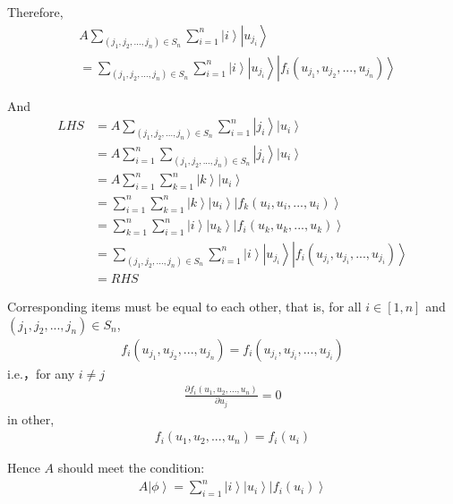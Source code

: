 \documentclass[%
 reprint,
 amsmath,amssymb,
pra,
]{revtex4-1}
\begin{document}
\begin{itemize}
Therefore,  
\begin{align*}
	&A\sum_{\left(j_1, j_2, ..., j_n\right)\in S_n}\sum_{i=1}^n \left|i\right\rangle\left|u_{j_i}\right\rangle \\
	&=\sum_{\left(j_1, j_2, ..., j_n\right)\in S_n}\sum_{i=1}^n\left|i\right\rangle\left|u_{j_i}\right\rangle\left|f_{i}\left(u_{j_1}, u_{j_2}, ..., u_{j_n}\right)\right\rangle
\end{align*}

And
\begin{align*}
	LHS &= A\sum_{\left(j_1, j_2, ..., j_n\right)\in S_n}\sum_{i=1}^n \left|j_i\right\rangle\left|u_i\right\rangle\\
	&= A\sum_{i=1}^n\sum_{\left(j_1, j_2, ..., j_n\right)\in S_n}\left|j_i\right\rangle\left|u_i\right\rangle\\
	&= A\sum_{i=1}^n\sum_{k=1}^n\left|k\right\rangle\left|u_i\right\rangle \\
	&= \sum_{i=1}^n\sum_{k=1}^n\left|k\right\rangle\left|u_i\right\rangle\left|f_{k}\left(u_i, u_i, ..., u_i\right)\right\rangle\\
	&= \sum_{k=1}^n\sum_{i=1}^n\left|i\right\rangle\left|u_k\right\rangle\left|f_{i}\left(u_k, u_k, ..., u_k\right)\right\rangle \\
	&= \sum_{\left(j_1, j_2, ..., j_n\right)\in S_n}\sum_{i=1}^n\left|i\right\rangle\left|u_{j_i}\right\rangle\left|f_{i}\left(u_{j_i}, u_{j_i}, ..., u_{j_i}\right)\right\rangle\\
	&= RHS
\end{align*}

Corresponding items must be equal to each other, that is, for all $i \in \left[1, n\right]$ and $\left(j_1, j_2, ..., j_n\right)\in S_n$, 
\begin{align*}
	f_{i}\left(u_{j_1}, u_{j_2}, ..., u_{j_n}\right) = f_{i}\left(u_{j_i}, u_{j_i}, ..., u_{j_i}\right)
\end{align*}
i.e.，for any $i\neq j$
\begin{align*}
	\frac{\partial f_i\left(u_1, u_2, ..., u_n\right)}{\partial u_j} = 0
\end{align*}
in other, 
\begin{align*}
	f_i\left(u_1, u_2, ...,u_n\right) = f_i\left(u_i\right)
\end{align*}

Hence $A$ should meet the condition: 
\begin{align*}
	A\left|\phi\right\rangle = \sum_{i=1}^n \left|i\right\rangle\left|u_i\right\rangle\left|f_{i}\left(u_i\right)\right\rangle
\end{align*}


\end{itemize}
\end{document}
